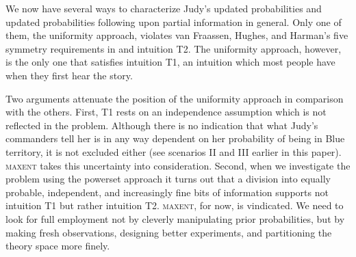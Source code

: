 \documentclass[11pt]{article}
\begin{document}
We now have several ways to characterize Judy's updated
probabilities and updated probabilities following upon partial
information in general. Only one of them, the uniformity approach,
violates van Fraassen, Hughes, and Harman's five symmetry requirements
in  and intuition T2. The uniformity
approach, however, is the only one that satisfies intuition T1, an
intuition which most people have when they first hear the story. 

Two arguments attenuate the position of the uniformity approach in
comparison with the others. First, T1 rests on an independence
assumption which is not reflected in the problem. Although there is no
indication that what Judy's commanders tell her is in any way
dependent on her probability of being in Blue territory, it is not
excluded either (see scenarios II and III earlier in this paper).
\textsc{maxent} takes this uncertainty into consideration. Second,
when we investigate the problem using the powerset approach it turns
out that a division into equally probable, independent, and
increasingly fine bits of information supports not intuition T1 but
rather intuition T2. \textsc{maxent}, for now, is vindicated. We need
to look for full employment not by cleverly manipulating prior
probabilities, but by making fresh observations, designing better
experiments, and partitioning the theory space more finely.





\end{document}

